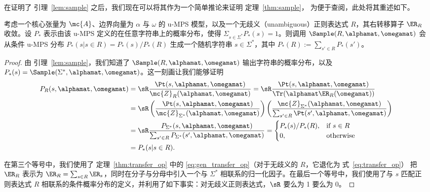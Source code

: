 在证明了 引理~\ref{lem:sample} 之后，我们现在可以将其作为一个简单推论来证明 定理~\ref{thm:sample}，
为便于查阅，此处将其重述如下。

\begin{theorem*}
考虑一个核心张量为 $\mc{A}$、边界向量为 $\alpha$ 与 $\omega$ 的 u-MPS 模型，以及一个无歧义（unambiguous）正则表达式 $R$，其右转移算子 $\ER_R$ 收敛。设 $P_*$ 表示由该 u-MPS 定义的在任意字符串上的概率分布，使得 $\Sigma_{s\in\Sigma^*} P_*(s) = 1$。则调用 $\Sample(R, \alphamat, \omegamat)$ 会从条件 u-MPS 分布 $P_*(s | s \in R) = P_*(s) / P_*(R)$ 生成一个随机字符串 $s \in \Sigma^*$，其中 $P_*(R) := \sum_{s' \in R} P_*(s')$。
\end{theorem*}

\begin{proof}

由 引理~\ref{lem:sample}，我们知道了 $\Sample(R, \alphamat, \omegamat)$ 输出字符串的概率分布，以及 $P_*(s) = \Sample(\Sigma^*, \alphamat, \omegamat)$。这一刻画让我们能够证明
%
\begin{align*}
    P_R(s, \alphamat, \omegamat) &= \sR \frac{\Pt(s, \alphamat, \omegamat)}{\mc{Z}_R(\alphamat, \omegamat)} = \sR \frac{\Pt(s, \alphamat, \omegamat)}{\Tr(\alphamat \ER_R(\omegamat))} \\
    &= \sR \left( \frac{\Pt(s, \alphamat, \omegamat)}{\mc{Z}_{\Sigma^*}(\alphamat, \omegamat)} \right) \left( \frac{\mc{Z}_{\Sigma^*}(\alphamat, \omegamat)}{\sum_{s' \in R} \Pt(s', \alphamat, \omegamat)} \right) \\
    &= \sR \frac{P_{\Sigma^*}(s, \alphamat, \omegamat)}{\sum_{s' \in R} P_{\Sigma^*}(s', \alphamat, \omegamat)} =
    \begin{cases}
    P_*(s) / P_*(R), &\text{if } s \in R\\
    0, &\text{otherwise}
    \end{cases} \\
    &= P_*(s | s \in R).
\end{align*}

在第三个等号中，我们使用了 定理~\ref{thm:transfer_op} 中的 \eqref{eq:gen_transfer_op}（对于无歧义的 $R$，它退化为 式~\eqref{eq:transfer_op}）
把 $\ER_R$ 表示为 $\ER_R = \sum_{s \in R} \ER_s$，同时在分子与分母中引入一个与 $\Sigma^*$ 相联系的归一化因子。在最后一个等号中，我们使用了与 $s$ 匹配正则表达式 $R$ 相联系的条件概率分布的定义，并利用了如下事实：对无歧义正则表达式，$\sR$ 要么为 1 要么为 0。

\end{proof}


